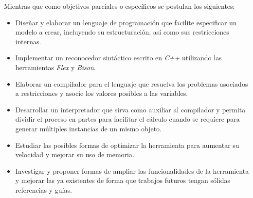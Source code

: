 \label{sect:objetivos}
Mientras que como objetivos parciales o específicos se postulan los siguientes:
\begin{itemize}
\item {Diseñar y elaborar un lenguaje de programación que facilite especificar un 
modelo a crear, incluyendo su estructuración, así como sus restricciones internas.}
\item Implementar un reconocedor sintáctico escrito en \emph{C++} utilizando las herramientas \emph{Flex} y \emph{Bison}.
\item Elaborar un compilador para el lenguaje que resuelva los problemas asociados a restricciones
y asocie los valores posibles a las variables.
\item {Desarrollar un interpretador que sirva como auxiliar al compilador y permita dividir
el proceso en partes para facilitar el cálculo cuando se requiere para generar múltiples
instancias de un mismo objeto.}
\item {Estudiar las posibles formas de optimizar la herramienta para aumentar su velocidad y
mejorar su uso de memoria.}
\item {Investigar y proponer formas de ampliar las funcionalidades de la herramienta y mejorar las
ya existentes de forma que trabajos futuros tengan sólidas referencias y guías.} 
\end{itemize}
